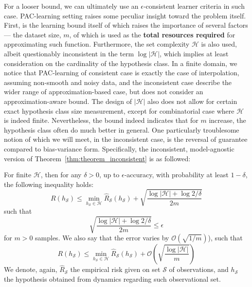For a looser bound, we can ultimately use an $\epsilon$-consistent learner criteria in such case. PAC-learning setting raises some peculiar insight toward the problem itself. First, is the learning bound itself of which raises the importance of several factors --- the dataset size, $m$, of which is used as the \textbf{total resources required} for approximating such function. Furthermore, the set complexity $\mathcal{H}$ is also used, albeit questionably inconsistent in the term $\log{|\mathcal{H}|}$, which implies at least consideration on the cardinality of the hypothesis class. In a finite domain, we notice that PAC-learning of consistent case is exactly the case of interpolation, assuming non-smooth and noisy data, and the inconsistent case describe the wider range of approximation-based case, but does not consider an approximation-aware bound. The design of $|\mathcal{H}|$ also does not allow for certain exact hypothesis class size measurement, except for combinatorial case where $\mathcal{H}$ is indeed finite. Nevertheless, the bound indeed indicates that for $m$ increase, the hypothesis class often do much better in general. One particularly troublesome notion of which we will meet, in the inconsistent case, is the reversal of guarantee compared to bias-variance form. Specifically, the inconsistent, model-agnostic version of Theorem~\ref{thm:theorem_inconsistent} is as followed:
\begin{theorem}
    For finite $\mathcal{H}$, then for any $\delta > 0$, up to $\epsilon$-accuracy, with probability at least $1-\delta$, the following inequality holds: 
    \begin{equation}
        R(h_{\mathcal{S}}) \leq \min_{h_{\mathcal{S}}\in\mathcal{H}}\hat{R}_{\mathcal{S}} (h_{\mathcal{S}}) + \sqrt{\frac{\log{|\mathcal{H}|}+ \log{2/\delta}}{2m}}
    \end{equation}
    such that 
    \begin{equation}
        \sqrt{\frac{\log{|\mathcal{H}|}+ \log{2/\delta}}{2m}} \leq \epsilon
    \end{equation}
    for $m>0$ samples. We also say that the error varies by $\mathcal{O}(\sqrt{1/m})$), such that 
    \begin{equation}
        R(h_{\mathcal{S}}) \leq \min_{h_{\mathcal{S}}\in\mathcal{H}}\hat{R}_{\mathcal{S}} (h_{\mathcal{S}}) + \mathcal{O}\left(\sqrt{\frac{\log{|\mathcal{H}|}}{m}}\right)
    \end{equation}
    We denote, again, $\hat{R}_{\mathcal{S}}$ the empirical risk given on set $\mathcal{S}$ of observations, and $h_{\mathcal{S}}$ the hypothesis obtained from dynamics regarding such observational set.  
\end{theorem}

